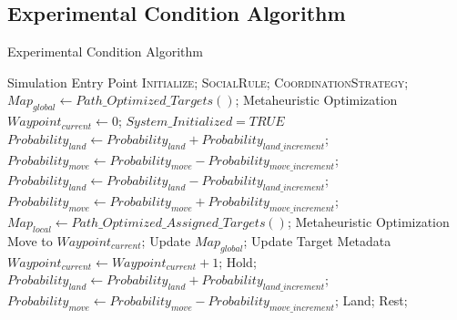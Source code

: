 \documentclass{report}
\begin{document}
\begin{appendices}
\chapter{Experimental Condition Algorithm}
\begin{algorithm}
	\caption{Experimental Condition Algorithm}
	\label{alg:exp_algo}
	\begin{algorithmic}[1]
		 {} \Comment Simulation Entry Point
				\State \textsc{Initialize};
				\State \textsc{SocialRule};
				\State \textsc{CoordinationStrategy};
			\EndWhile
		\EndProcedure
		\\
				\State $Map_{global} \gets Path\_Optimized\_Targets()$; \Comment Metaheuristic Optimization
				\State $Waypoint_{current} \gets 0$;
				\State $System\_Initialized = TRUE$
			\EndIf
		\EndProcedure
		\\
					\State $Probability_{land} \gets Probability_{land} + Probability_{land\_increment}$;
					\State $Probability_{move} \gets Probability_{move} - Probability_{move\_increment}$;
					\State $Probability_{land} \gets Probability_{land} - Probability_{land\_increment}$;
					\State $Probability_{move} \gets Probability_{move} + Probability_{move\_increment}$;
				\EndIf
			\EndIf
		\EndProcedure
		\\
				\State $Map_{local} \gets Path\_Optimized\_Assigned\_Targets()$; \Comment Metaheuristic Optimization
				\State Move to $Waypoint_{current}$;
						\State Update $Map_{global}$; \Comment Update Target Metadata
						\State $Waypoint_{current} \gets Waypoint_{current} + 1$;
					\Else
						\State Hold;
					\EndIf
					\State $Probability_{land} \gets Probability_{land} + Probability_{land\_increment}$;
					\State $Probability_{move} \gets Probability_{move} - Probability_{move\_increment}$;
				\EndIf
				\State Land;
			\Else
				\State Rest;
			\EndIf
		\EndProcedure
	\end{algorithmic}
\end{algorithm}

\end{appendices}
\end{document}
